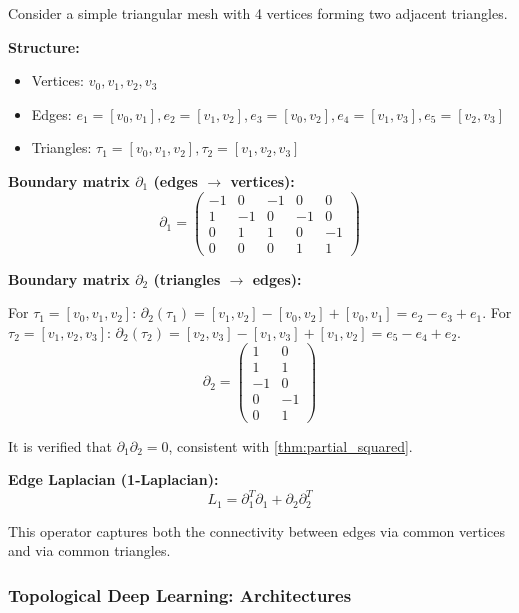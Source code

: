 \begin{example}\label{ex:hodge_triangle_mesh}
Consider a simple triangular mesh with 4 vertices forming two adjacent triangles.

\textbf{Structure:}
\begin{itemize}
    \item Vertices: $v_0, v_1, v_2, v_3$
    \item Edges: $e_1 = [v_0,v_1], e_2 = [v_1,v_2], e_3 = [v_0,v_2], e_4 = [v_1,v_3], e_5 = [v_2,v_3]$
    \item Triangles: $\tau_1 = [v_0,v_1,v_2], \tau_2 = [v_1,v_2,v_3]$
\end{itemize}

\textbf{Boundary matrix $\partial_1$ (edges $\to$ vertices):}
\[\partial_1 = \begin{pmatrix}
-1 & 0 & -1 & 0 & 0 \\
1 & -1 & 0 & -1 & 0 \\
0 & 1 & 1 & 0 & -1 \\
0 & 0 & 0 & 1 & 1
\end{pmatrix}\]

\textbf{Boundary matrix $\partial_2$ (triangles $\to$ edges):}

For $\tau_1 = [v_0,v_1,v_2]$: $\partial_2(\tau_1) = [v_1,v_2] - [v_0,v_2] + [v_0,v_1] = e_2 - e_3 + e_1$.
For $\tau_2 = [v_1,v_2,v_3]$: $\partial_2(\tau_2) = [v_2,v_3] - [v_1,v_3] + [v_1,v_2] = e_5 - e_4 + e_2$.
\[\partial_2 = \begin{pmatrix}
1 & 0 \\
1 & 1 \\
-1 & 0 \\
0 & -1 \\
0 & 1
\end{pmatrix}\]

It is verified that $\partial_1 \partial_2 = 0$, consistent with \autoref{thm:partial_squared}.

\textbf{Edge Laplacian (1-Laplacian):}
\[L_1 = \partial_1^T \partial_1 + \partial_2 \partial_2^T\]

This operator captures both the connectivity between edges via common vertices and via common triangles.
\end{example}

\subsubsection{Topological Deep Learning: Architectures}


